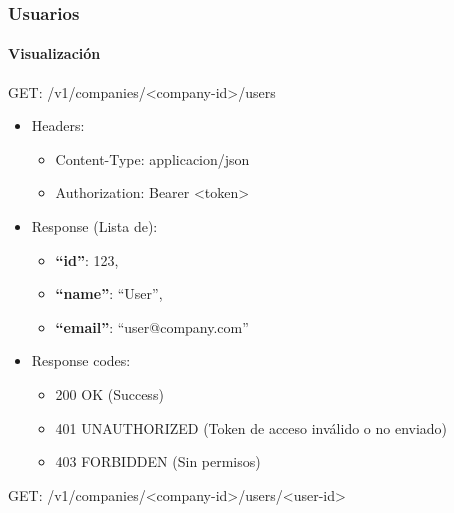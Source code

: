 \documentclass[12pt,a4paperpaper,]{report}
\providecommand{\tightlist}{%
  \setlength{\itemsep}{0pt}\setlength{\parskip}{0pt}}
\let\oldparagraph\paragraph
\renewcommand{\paragraph}[1]{\oldparagraph{#1}\mbox{}}
\begin{document}
\subsubsection{Usuarios}\label{usuarios}

\paragraph{Visualización}\label{visualizaciuxf3n-1}

GET: /v1/companies/\textless{}company-id\textgreater{}/users

\begin{itemize}
\tightlist
\item
  Headers:

  \begin{itemize}
  \tightlist
  \item
    Content-Type: applicacion/json
  \item
    Authorization: Bearer \textless{}token\textgreater{}
  \end{itemize}
\item
  Response (Lista de):

  \begin{itemize}
  \tightlist
  \item
    \textbf{``id''}: 123,
  \item
    \textbf{``name''}: ``User'',
  \item
    \textbf{``email''}: ``user@company.com''
  \end{itemize}
\item
  Response codes:

  \begin{itemize}
  \tightlist
  \item
    200 OK (Success)
  \item
    401 UNAUTHORIZED (Token de acceso inválido o no enviado)
  \item
    403 FORBIDDEN (Sin permisos)
  \end{itemize}
\end{itemize}

GET:
/v1/companies/\textless{}company-id\textgreater{}/users/\textless{}user-id\textgreater{}
\end{document}
